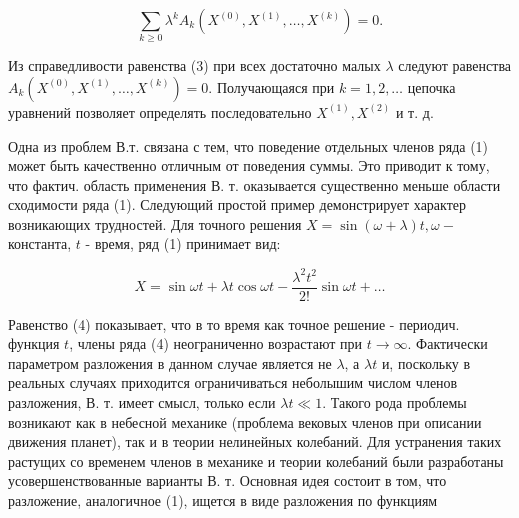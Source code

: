 \documentclass[10pt]{article}
\begin{document}
\[

\sum_{k \geqslant 0} \lambda^{k} A_{k}\left(X^{(0)}, X^{(1)}, \ldots, X^{(k)}\right)=0 .

\]



Из справедливости равенства (3) при всех достаточно малых $\lambda$ следуют равенства $A_{k}\left(X^{(0)}, X^{(1)}, \ldots, X^{(k)}\right)=0$. Получающаяся при $k=1,2, \ldots$ цепочка уравнений позволяет определять последовательно $X^{(1)}, X^{(2)}$ и т. д.



Одна из проблем В.т. связана с тем, что поведение отдельных членов ряда (1) может быть качественно отличным от поведения суммы. Это приводит к тому, что фактич. область применения В. т. оказывается существенно меньше области сходимости ряда (1). Следующий простой пример демонстрирует характер возникающих трудностей. Для точного решения $X=\sin (\omega+\lambda) t, \omega-$ константа, $t$ - время, ряд (1) принимает вид:



\[

X=\sin \omega t+\lambda t \cos \omega t-\frac{\lambda^{2} t^{2}}{2 !} \sin \omega t+\ldots

\]



Равенство (4) показывает, что в то время как точное решение - периодич. функция $t$, члены ряда (4) неограниченно возрастают при $t \rightarrow \infty$. Фактически параметром разложения в данном случае является не $\lambda$, а $\lambda t$ и, поскольку в реальных случаях приходится ограничиваться неболышим числом членов разложения, В. т. имеет смысл, только если $\lambda t \ll 1$. Такого рода проблемы возникают как в небесной механике (проблема вековых членов при описании движения планет), так и в теории нелинейных колебаний. Для устранения таких растущих со временем членов в механике и теории колебаний были разработаны усовершенствованные варианты В. т. Основная идея состоит в том, что разложение, аналогичное (1), ищется в виде разложения по функциям
\end{document}
